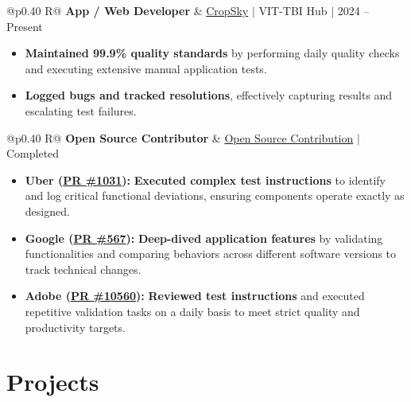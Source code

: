\documentclass[a4paper,11pt]{article}
\newcommand{\subheading}[1]{\textbf{#1}}
\newcommand{\meta}[1]{{\fontsize{10}{12}\selectfont\textcolor[HTML]{3A3A3A}{#1}}}
\newcommand{\ulink}[2]{\href{#1}{#2}}
\begin{document}
\begin{tabularx}{\linewidth}{@{}p{0.40\linewidth} R@{}}
\subheading{App / Web Developer} & \meta{\ulink{https://sites.google.com/view/cropsky/home}{CropSky} $|$ VIT-TBI Hub $|$ 2024 -- Present}
\end{tabularx}
\begin{itemize}[nosep, leftmargin=1.5em, itemsep=2pt, topsep=2pt]
  \item {\color[HTML]{0A0A0A}\fontsize{11}{14}\selectfont \textbf{Maintained 99.9\% quality standards} by performing daily quality checks and executing extensive manual application tests.}
  \item {\color[HTML]{0A0A0A}\fontsize{11}{14}\selectfont \textbf{Logged bugs and tracked resolutions}, effectively capturing results and escalating test failures.}
\end{itemize}

\begin{tabularx}{\linewidth}{@{}p{0.40\linewidth} R@{}}
\subheading{Open Source Contributor} & \meta{\ulink{https://github.com/su-jin1425/My-Open-Source-Contributions}{Open Source Contribution} $|$ Completed}
\end{tabularx}
\begin{itemize}[nosep, leftmargin=1.5em, itemsep=2pt, topsep=2pt]
  \item {\color[HTML]{0A0A0A}\fontsize{11}{14}\selectfont \textbf{Uber (\ulink{https://github.com/uber/causalml/pull/1031}{PR \#1031}):} \textbf{Executed complex test instructions} to identify and log critical functional deviations, ensuring components operate exactly as designed.}
  \item {\color[HTML]{0A0A0A}\fontsize{11}{14}\selectfont \textbf{Google (\ulink{https://github.com/google/xrblocks/pull/567}{PR \#567}):} \textbf{Deep-dived application features} by validating functionalities and comparing behaviors across different software versions to track technical changes.}
  \item {\color[HTML]{0A0A0A}\fontsize{11}{14}\selectfont \textbf{Adobe (\ulink{https://github.com/adobe/react-spectrum/pull/10560}{PR \#10560}):} \textbf{Reviewed test instructions} and executed repetitive validation tasks on a daily basis to meet strict quality and productivity targets.}
\end{itemize}

\section{Projects}
\vspace{2pt}
\end{document}
